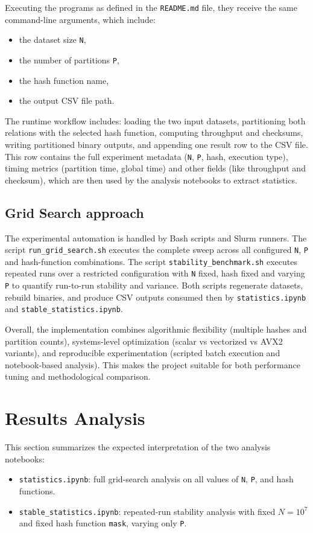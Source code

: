 \documentclass[11pt,a4paper]{article}
\begin{document}
Executing the programs as defined in the \texttt{README.md} file, they receive the same command-line arguments, which include:
\begin{itemize}
    \item the dataset size \texttt{N},
    \item the number of partitions \texttt{P},
    \item the hash function name,
    \item the output CSV file path. 
\end{itemize}
The runtime workflow includes: loading the two input datasets, partitioning both relations with the 
selected hash function, computing throughput and checksums, writing partitioned binary outputs, and appending one result row 
to the CSV file. This row contains the full experiment metadata (\texttt{N}, \texttt{P}, hash, execution type), timing metrics 
(partition time, global time) and other fields (like throughput and checksum), which are then used by the analysis notebooks 
to extract statistics.

\subsection{Grid Search approach}
The experimental automation is handled by Bash scripts and Slurm runners. The script \texttt{run\_grid\_search.sh} executes 
the complete sweep across all configured \texttt{N}, \texttt{P} and hash-function combinations. The script \texttt{stability\_benchmark.sh} 
executes repeated runs over a restricted configuration with \texttt{N} fixed, hash fixed and varying \texttt{P} to quantify run-to-run 
stability and variance. Both scripts regenerate datasets, rebuild binaries, 
and produce CSV outputs consumed then by \texttt{statistics.ipynb} and \texttt{stable\_statistics.ipynb}.

Overall, the implementation combines algorithmic flexibility (multiple hashes and partition counts), systems-level optimization 
(scalar vs vectorized vs AVX2 variants), and reproducible experimentation (scripted batch execution and notebook-based analysis). 
This makes the project suitable for both performance tuning and methodological comparison.


\section{Results Analysis}
This section summarizes the expected interpretation of the two analysis notebooks:
\begin{itemize}
    \item \texttt{statistics.ipynb}: full grid-search analysis on all values of \texttt{N}, \texttt{P}, and hash functions.
    \item \texttt{stable\_statistics.ipynb}: repeated-run stability analysis with fixed $N=10^7$ and fixed hash function \texttt{mask}, varying only \texttt{P}.
\end{itemize}
\end{document}
